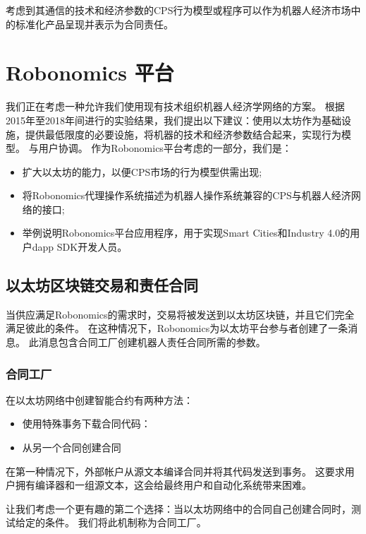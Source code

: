 \documentclass[UTF8]{article}
\begin{document}
考虑到其通信的技术和经济参数的CPS行为模型或程序可以作为机器人经济市场中的标准化产品呈现并表示为合同责任。

\section{Robonomics 平台}

我们正在考虑一种允许我们使用现有技术组织机器人经济学网络的方案。 根据2015年至2018年间进行的实验结果，我们提出以下建议：使用以太坊作为基础设施，提供最低限度的必要设施，将机器的技术和经济参数结合起来，实现行为模型。 与用户协调。 作为Robonomics平台考虑的一部分，我们是：

\begin{itemize}[noitemsep]
	\item 扩大以太坊的能力，以便CPS市场的行为模型供需出现;
	\item 将Robonomics代理操作系统描述为机器人操作系统兼容的CPS与机器人经济网络的接口\cite{Quigley2009ROS:System};
	\item 举例说明Robonomics平台应用程序，用于实现Smart Cities和Industry 4.0的用户dapp SDK开发人员。
\end{itemize}

\subsection{以太坊区块链交易和责任合同}

当供应满足Robonomics的需求时，交易将被发送到以太坊区块链，并且它们完全满足彼此的条件。 在这种情况下，Robonomics为以太坊平台参与者创建了一条消息。 此消息包含合同工厂创建机器人责任合同所需的参数。

\subsubsection{合同工厂}

在以太坊网络中创建智能合约有两种方法：
\begin{itemize}[noitemsep]
	\item 使用特殊事务下载合同代码：
	\item 从另一个合同创建合同
\end{itemize}

在第一种情况下，外部帐户从源文本编译合同并将其代码发送到事务。 这要求用户拥有编译器和一组源文本，这会给最终用户和自动化系统带来困难。

让我们考虑一个更有趣的第二个选择：当以太坊网络中的合同自己创建合同时，测试给定的条件。 我们将此机制称为合同工厂。
\end{document}
